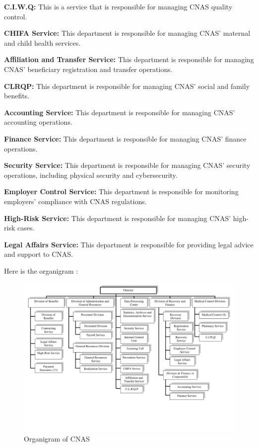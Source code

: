 \textbf{C.I.W.Q:} This is a service that is responsible for managing CNAS quality control.

\textbf{CHIFA Service:} This department is responsible for managing CNAS' maternal and child health services.

\textbf{Affiliation and Transfer Service:} This department is responsible for managing CNAS' beneficiary registration and transfer operations.

\textbf{CLRQP:} This department is responsible for managing CNAS' social and family benefits.

\textbf{Accounting Service:} This department is responsible for managing CNAS' accounting operations.

\textbf{Finance Service:} This department is responsible for managing CNAS' finance operations.

\textbf{Security Service:} This department is responsible for managing CNAS' security operations, including physical security and cybersecurity.

\textbf{Employer Control Service:} This department is responsible for monitoring employers' compliance with CNAS regulations.

\textbf{High-Risk Service:} This department is responsible for managing CNAS' high-risk cases.

\textbf{Legal Affairs Service:} This department is responsible for providing legal advice and support to CNAS.
\medskip

Here is the organigram : 
\begin{figure}[h]
  \centering
  \includegraphics[width=1.0\textwidth]{organigram.png}
  \caption{Organigram of CNAS}
  \label{fig:organigram}
\end{figure}
